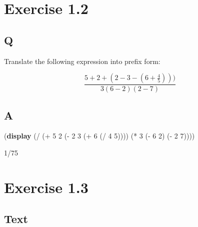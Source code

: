 \documentclass[
]{article}
\newenvironment{Shaded}{}{}
\newcommand{\DecValTok}[1]{\textcolor[rgb]{0.25,0.63,0.44}{#1}}
\newcommand{\KeywordTok}[1]{\textcolor[rgb]{0.00,0.44,0.13}{\textbf{#1}}}
\newcommand{\NormalTok}[1]{#1}
\newcommand{\OperatorTok}[1]{\textcolor[rgb]{0.40,0.40,0.40}{#1}}
\begin{document}
\hypertarget{exercise-1.2}{%
\section{Exercise 1.2}\label{exercise-1.2}}

\hypertarget{q-1}{%
\subsection{Q}\label{q-1}}

Translate the following expression into prefix form:

\begin{equation}
  \frac{5 + 2 + (2 - 3 - (6 + \frac{4}{5})))}
            {3(6 - 2)(2 - 7)}
\end{equation}

\hypertarget{a-1}{%
\subsection{A}\label{a-1}}

\hypertarget{EX1-2}{%
\label{EX1-2}}%
\begin{Shaded}
\begin{Highlighting}[]
\NormalTok{(}\KeywordTok{display}
\NormalTok{ (}\OperatorTok{/}\NormalTok{ (}\OperatorTok{+} \DecValTok{5} \DecValTok{2}\NormalTok{ (}\OperatorTok{{-}} \DecValTok{2} \DecValTok{3}\NormalTok{ (}\OperatorTok{+} \DecValTok{6}\NormalTok{ (}\OperatorTok{/} \DecValTok{4} \DecValTok{5}\NormalTok{))))}
\NormalTok{   (}\OperatorTok{*} \DecValTok{3}\NormalTok{ (}\OperatorTok{{-}} \DecValTok{6} \DecValTok{2}\NormalTok{) (}\OperatorTok{{-}} \DecValTok{2} \DecValTok{7}\NormalTok{))))}
\end{Highlighting}
\end{Shaded}

\begin{Shaded}
\begin{Highlighting}[]
\DecValTok{1}\NormalTok{/75}
\end{Highlighting}
\end{Shaded}

\hypertarget{exercise-1.3}{%
\section{Exercise 1.3}\label{exercise-1.3}}

\hypertarget{text}{%
\subsection{Text}\label{text}}
\end{document}
